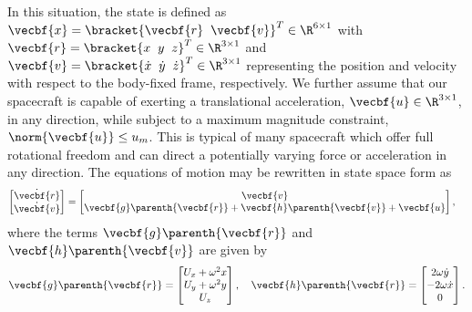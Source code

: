 In this situation, the state is defined as \( \vecbf{x} = \bracket{\vecbf{r}~\>\vecbf{v}}^T \in \R^{6 \times 1}\) with \(\vecbf{r} = \bracket{x~\>y~\>z}^T \in \R^{3\times1}\) and \(\vecbf{v}= \bracket{ \dot{x}~\>\dot{y}~\>\dot{z} }^T \in \R^{3\times1}\) representing the position and velocity with respect to the body-fixed frame, respectively.
We further assume that our spacecraft is capable of exerting a translational acceleration, \( \vecbf{u} \in \R^{3\times1} \), in any direction, while subject to a maximum magnitude constraint, \( \norm{\vecbf{u}} \leq u_m \).
This is typical of many spacecraft which offer full rotational freedom and can direct a potentially varying force or acceleration in any direction.
The equations of motion may be rewritten in state space form as
\begin{align}\label{eq:state_space_eoms}
    \begin{bmatrix} \dot{\vecbf{r}} \\ \dot{\vecbf{v}} \end{bmatrix} &=
    \begin{bmatrix}\vecbf{v} \\ \vecbf{g} \parenth{\vecbf{r}} + \vecbf{h}\parenth{\vecbf{v}} + \vecbf{u} \end{bmatrix} ,
\end{align}
where the terms \(\vecbf{g} \parenth{\vecbf{r}} \) and \( \vecbf{h}\parenth{\vecbf{v}} \) are given by
\begin{align}\label{eq:state_space_terms}
    \vecbf{g}\parenth{\vecbf{r}} = \begin{bmatrix}  U_x + \omega^2 x \\ U_y + \omega^2 y \\ U_z \end{bmatrix} ,\quad
    \vecbf{h}\parenth{\vecbf{r}} = \begin{bmatrix} 2 \omega \dot{y} \\ -2 \omega \dot{x} \\ 0 \end{bmatrix} .
\end{align}

